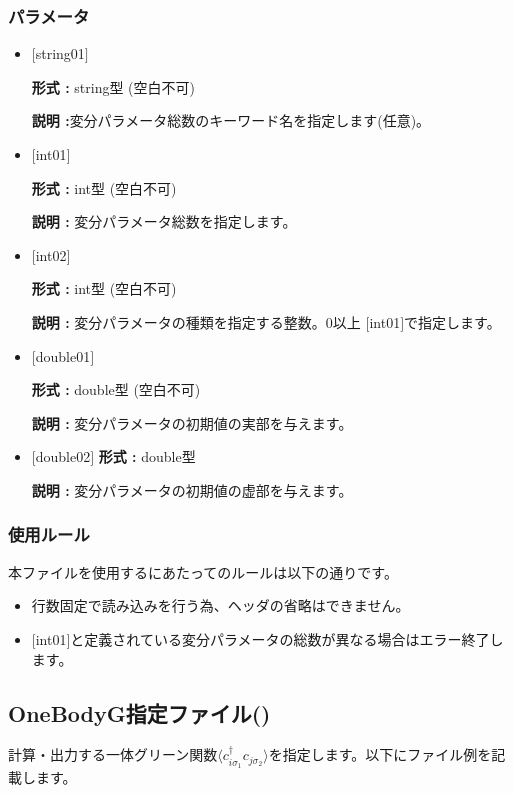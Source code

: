 \subsubsection{パラメータ}
 \begin{itemize}

   \item  $[$string01$]$
   
    {\bf 形式 :} string型 (空白不可)

   {\bf 説明 :}変分パラメータ総数のキーワード名を指定します(任意)。

   \item  $[$int01$]$
   
    {\bf 形式 :} int型 (空白不可)

   {\bf 説明 :} 変分パラメータ総数を指定します。

  \item  $[$int02$]$
  
 {\bf 形式 :} int型 (空白不可)

{\bf 説明 :} 変分パラメータの種類を指定する整数。0以上 $[$int01$]$で指定します。
 
 \item  $[$double01$]$
   
   {\bf 形式 :} double型 (空白不可)

  {\bf 説明 :} 変分パラメータの初期値の実部を与えます。
   
   \item  $[$double02$]$
   {\bf 形式 :} double型  

  {\bf 説明 :} 変分パラメータの初期値の虚部を与えます。
  
\end{itemize}

\subsubsection{使用ルール}
本ファイルを使用するにあたってのルールは以下の通りです。
\begin{itemize}
\item 行数固定で読み込みを行う為、ヘッダの省略はできません。
\item $[$int01$]$と定義されている変分パラメータの総数が異なる場合はエラー終了します。
\end{itemize}


\newpage
\subsection{OneBodyG指定ファイル()}
\label{Subsec:onebodyg}
計算・出力する一体グリーン関数$\langle c_{i\sigma_1}^{\dagger}c_{j\sigma_2}\rangle$を指定します。以下にファイル例を記載します。

